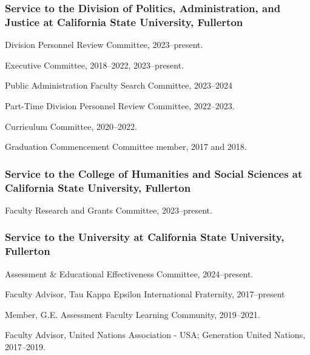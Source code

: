 \documentclass[12pt,letterpaper]{article}
\renewenvironment{itemize}{
  \begin{list}{}{
    \setlength{\leftmargin}{1.5em}
    \setlength{\itemsep}{0.25em}
    \setlength{\parskip}{0pt}
    \setlength{\parsep}{0.25em}
  }
}{
  \end{list}
}
\begin{document}
\subsubsection*{Service to the Division of Politics, Administration, and Justice at California State University, Fullerton}
\begin{itemize}\leftmargin=2pt\itemindent=-15pt
    \item Division Personnel Review Committee, 2023--present.
    \item Executive Committee, 2018--2022, 2023--present.
    \item Public Administration Faculty Search Committee, 2023--2024
    \item Part-Time Division Personnel Review Committee, 2022--2023. 
    \item Curriculum Committee, 2020--2022.
    \item Graduation Commencement Committee member, 2017 and 2018. 
\end{itemize}

\subsubsection*{Service to the College of Humanities and Social Sciences at California State University, Fullerton}
\begin{itemize}\leftmargin=2pt\itemindent=-15pt
    \item Faculty Research and Grants Committee, 2023--present.
\end{itemize}

\subsubsection*{Service to the University at California State University, Fullerton}
\begin{itemize}\leftmargin=2pt\itemindent=-15pt
    \item Assessment \& Educational Effectiveness Committee, 2024--present.
    \item Faculty Advisor, Tau Kappa Epsilon International Fraternity, 2017--present
    \item Member, G.E. Assessment Faculty Learning Community, 2019--2021.
    \item Faculty Advisor, United Nations Association - USA; Generation United Nations, 2017--2019.
\end{itemize}
\end{document}
